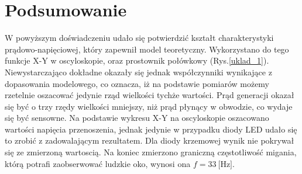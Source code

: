 \documentclass[10pt,a4paper]{article}
\begin{document}
\section*{Podsumowanie}
W powyższym doświadczeniu udało się potwierdzić kształt charakterystyki prądowo-napięciowej, który zapewnił model teoretyczny. Wykorzystano do tego funkcje X-Y w oscyloskopie, oraz prostownik połówkowy (Rys.\ref{uklad_1}). Niewystarczająco dokładne okazały się jednak współczynniki wynikające z dopasowania modelowego, co oznacza, iż na podstawie pomiarów możemy rzetelnie oszacować jedynie rząd wielkości tychże wartości. Prąd generacji okazał się być o trzy rzędy wielkości mniejszy, niż prąd płynący w obwodzie, co wydaje się być sensowne. Na podstawie wykresu X-Y na oscyloskopie oszacowano wartości napięcia przenoszenia, jednak jedynie w przypadku diody LED udało się to zrobić z zadowalającym rezultatem. Dla diody krzemowej wynik nie pokrywał się ze zmierzoną wartoscią. Na koniec zmierzono graniczną częstotliwość migania, którą potrafi zaobserwować ludzkie oko, wynosi ona $f = 33 \ \text{[Hz]} $.
\end{document}
